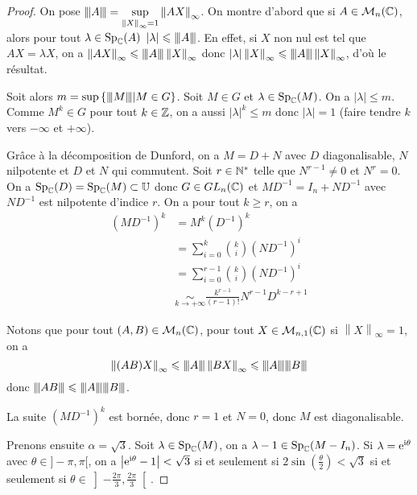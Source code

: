 \documentclass[12pt]{article}
\begin{document}
\begin{proof}
	On pose $\vertiii{A}=\sup\limits_{\left\lVert X\right\rVert_{\infty}=1}\left\lVert AX\right\rVert_{\infty}$. On montre d'abord que si $A\in\M_{n}(\C)$, alors pour tout $\lambda\in\Sp_{\C}(A)$ $\left\lvert\lambda\right\rvert\leqslant\vertiii{A}$. En effet, si $X$ non nul est tel que $AX=\lambda X$, on a $\left\lVert AX\right\rVert_{\infty}\leqslant\vertiii{A}\left\lVert X\right\rVert_{\infty}$ donc $\left\lvert\lambda\right\rvert\left\lVert X\right\rVert_{\infty}\leqslant\vertiii{A}\left\lVert X\right\rVert_{\infty}$, d'où le résultat.

	Soit alors $m=\sup\left\lbrace\vertiii{M}\middle| M\in G\right\rbrace$. Soit $M\in G$ et $\lambda\in\Sp_{\C}(M)$. On a $\left\lvert\lambda\right\rvert\leqslant m$. Comme $M^{k}\in G$ pour tout $k\in\Z$, on a aussi $\left\lvert\lambda\right\rvert^{k}\leqslant m$ donc $\left\lvert\lambda\right\rvert=1$ (faire tendre $k$ vers $-\infty$ et $+\infty$).

	Grâce à la décomposition de Dunford, on a $M=D+N$ avec $D$ diagonalisable, $N$ nilpotente et $D$ et $N$ qui commutent. Soit $r\in\N^{*}$ telle que $N^{r-1}\neq0$ et $N^{r}=0$. On a $\Sp_{\C}(D)=\Sp_{\C}(M)\subset\U$ donc $G\in GL_{n}(\C)$ et $MD^{-1}=I_{n}+ND^{-1}$ avec $ND^{-1}$ est nilpotente d'indice $r$. On a pour tout $k\geqslant r$, on a 
	\begin{align}
		(MD^{-1})^{k}
		&=M^{k}(D^{-1})^{k}\\
		&=\sum_{i=0}^{k}\binom{k}{i}(ND^{-1})^{i}\\
		&=\sum_{i=0}^{r-1}\binom{k}{i}(ND^{-1})^{i}\\
		&\underset{k\to+\infty}{\sim}\frac{k^{r-1}}{(r-1)!}N^{r-1}D^{k-r+1}
	\end{align}

	Notons que pour tout $(A,B)\in\M_{n}(\C)$, pour tout $X\in\M_{n,1}(\C)$ si $\left\lVert X\right\rVert_{\infty}=1$, on a 
	\begin{equation}
		\left\lVert (AB)X\right\rVert_{\infty}\leqslant\vertiii{A}\left\lVert BX\right\rVert_{\infty}\leqslant\vertiii{A}\vertiii{B}
	\end{equation}
	donc $\vertiii{AB}\leqslant\vertiii{A}\vertiii{B}$.

	La suite $(MD^{-1})^{k}$ est bornée, donc $r=1$ et $N=0$, donc $M$ est diagonalisable.

	Prenons ensuite $\alpha=\sqrt{3}$. Soit $\lambda\in\Sp_{\C}(M)$, on a $\lambda-1\in\Sp_{\C}(M-I_{n})$. Si $\lambda=\e^{\i\theta}$ avec $\theta\in]-\pi,\pi[$, on a $\left\lvert\e^{\i\theta}-1\right\rvert<\sqrt{3}$ si et seulement si $2\sin\left(\frac{\theta}{2}\right)<\sqrt{3}$ si et seulement si $\theta\in\left]-\frac{2\pi}{3},\frac{2\pi}{3}\right[$.


\end{proof}
\end{document}
